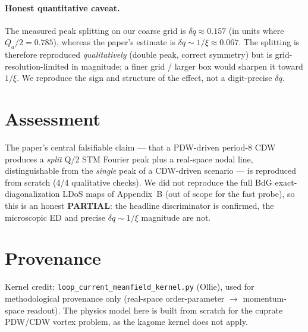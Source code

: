 \documentclass[11pt]{article}
\begin{document}
\paragraph{Honest quantitative caveat.} The measured peak splitting on our coarse
grid is $\delta q\approx0.157$ (in units where $Q_a/2=0.785$), whereas the
paper's estimate is $\delta q\sim1/\xi\approx0.067$. The splitting is therefore
reproduced \emph{qualitatively} (double peak, correct symmetry) but is
grid-resolution-limited in magnitude; a finer grid / larger box would sharpen it
toward $1/\xi$. We reproduce the sign and structure of the effect, not a
digit-precise $\delta q$.

\section{Assessment}
The paper's central falsifiable claim --- that a PDW-driven period-8 CDW produces
a \emph{split} Q/2 STM Fourier peak plus a real-space nodal line, distinguishable
from the \emph{single} peak of a CDW-driven scenario --- is reproduced from
scratch (4/4 qualitative checks). We did not reproduce the full BdG
exact-diagonalization LDoS maps of Appendix~B (out of scope for the fast probe),
so this is an honest \textbf{PARTIAL}: the headline discriminator is confirmed,
the microscopic ED and precise $\delta q\sim1/\xi$ magnitude are not.

\section*{Provenance}
Kernel credit: \texttt{loop\_current\_meanfield\_kernel.py} (Ollie), used for
methodological provenance only (real-space order-parameter $\to$ momentum-space
readout). The physics model here is built from scratch for the cuprate PDW/CDW
vortex problem, as the kagome kernel does not apply.
\end{document}
